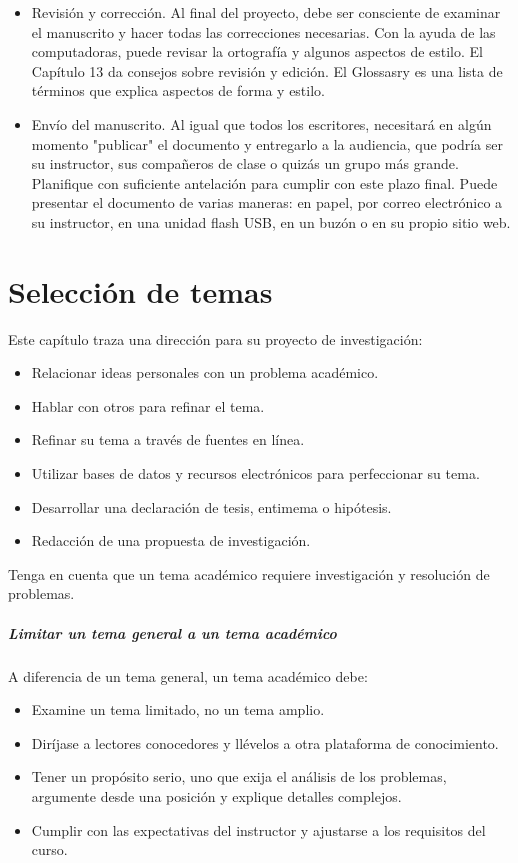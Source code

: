 \begin{itemize}
    \item  Revisión y corrección. Al final del proyecto, debe ser consciente de examinar el manuscrito y hacer todas las correcciones necesarias. Con la ayuda de las computadoras, puede revisar la ortografía y algunos aspectos de estilo. El Capítulo 13 da consejos sobre revisión y edición. El Glossasry es una lista de términos que explica aspectos de forma y estilo. 
    \item  Envío del manuscrito. Al igual que todos los escritores, necesitará en algún momento "publicar" el documento y entregarlo a la audiencia, que podría ser su instructor, sus compañeros de clase o quizás un grupo más grande. Planifique con suficiente antelación para cumplir con este plazo final. Puede presentar el documento de varias maneras: en papel, por correo electrónico a su instructor, en una unidad flash USB, en un buzón o en su propio sitio web.
\end{itemize}


\chapter{Selección de temas}

Este capítulo traza una dirección para su proyecto de investigación: 
\begin{itemize}
    \item Relacionar ideas personales con un problema académico.
    \item Hablar con otros para refinar el tema. 
     \item Refinar su tema a través de fuentes en línea.
     \item Utilizar bases de datos y recursos electrónicos para perfeccionar su tema.
     \item Desarrollar una declaración de tesis, entimema o hipótesis.
     \item Redacción de una propuesta de investigación.
 \end{itemize}

Tenga en cuenta que un tema académico requiere investigación y resolución de problemas.

\paragraph{Limitar un tema general a un tema académico}

A diferencia de un tema general, un tema académico debe:

\begin{itemize}
    \item Examine un tema limitado, no un tema amplio. 
    \item Diríjase a lectores conocedores y llévelos a otra plataforma de conocimiento. 
    \item Tener un propósito serio, uno que exija el análisis de los problemas, argumente desde una posición y explique detalles complejos. 
    \item Cumplir con las expectativas del instructor y ajustarse a los requisitos del curso.
\end{itemize}

